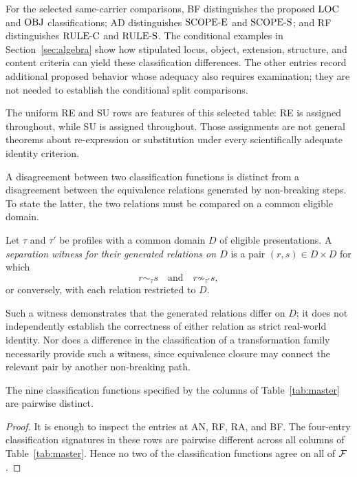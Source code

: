 For the selected same-carrier comparisons, BF distinguishes the
proposed $\mathrm{LOC}$ and $\mathrm{OBJ}$ classifications; AD distinguishes
$\mathrm{SCOPE\text{-}E}$ and $\mathrm{SCOPE\text{-}S}$; and RF distinguishes $\mathrm{RULE\text{-}C}$
and $\mathrm{RULE\text{-}S}$.
The conditional examples in Section~\ref{sec:algebra} show how
stipulated locus, object, extension, structure, and content criteria
can yield these classification differences.
The other entries record additional proposed behavior whose adequacy
also requires examination; they are not needed to establish the
conditional split comparisons.

The uniform RE and SU rows are features of this selected table:
RE is assigned \NEU{} throughout, while SU is assigned \BRK{} throughout.
Those assignments are not general theorems about re-expression or
substitution under every scientifically adequate identity criterion.

A disagreement between two classification functions is distinct from
a disagreement between the equivalence relations generated by
non-breaking steps.
To state the latter, the two relations must be
compared on a common eligible domain.

\begin{definition}
  \label{se200.def.SeparationWitness}
  Let $\tau$ and $\tau'$ be profiles with a common domain $D$ of
  eligible presentations.
  A \emph{separation witness for their generated
    relations on $D$} is a pair $(r,s)\in D\times D$ for which
  \[
    r\sim_\tau s \quad\text{and}\quad r\not\sim_{\tau'}s,
  \]
  or conversely, with each relation restricted to $D$.
\end{definition}

Such a witness demonstrates that the generated relations differ on
$D$; it does not independently establish the correctness of either
relation as strict real-world identity.
Nor does a difference in the
classification of a transformation family necessarily provide such
a witness, since equivalence closure may connect the relevant pair
by another non-breaking path.

\begin{proposition}
  \label{se200.prop.DistinctCoreProfiles}
  The nine classification functions specified by the columns of
  Table~\ref{tab:master} are pairwise distinct.
\end{proposition}

\begin{proof}
  It is enough to inspect the entries at AN, RF, RA, and BF.
  The four-entry classification signatures in these rows are
  pairwise different across all columns of
  Table~\ref{tab:master}.
  Hence no two of the
  classification functions agree on all of $\mathcal{F}$.
\end{proof}

